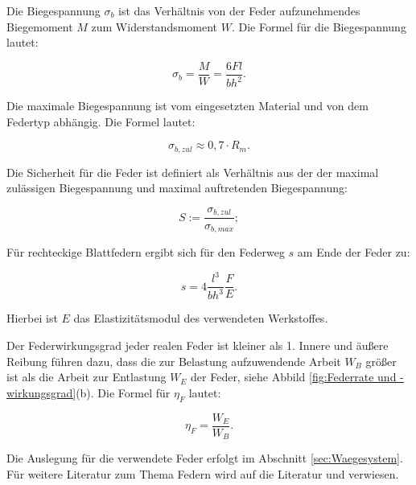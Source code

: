Die Biegespannung $\sigma_b$ ist das Verhältnis von der Feder aufzunehmendes Biegemoment $M$ zum Widerstandsmoment $W$. Die Formel für die Biegespannung lautet:

\begin{equation}
\sigma_b = \frac{M}{W}= \frac{6 F l}{b h^2}.
\label{eq:Biegespannung}
\end{equation}

Die maximale Biegespannung ist vom eingesetzten Material und von dem Federtyp abhängig. Die Formel lautet:

\begin{equation}
\sigma_{b,zul} \approx 0,7 \cdot R_m .
\label{eq:Biegespannung}
\end{equation}

Die Sicherheit für die Feder ist definiert als Verhältnis aus der  der maximal zulässigen Biegespannung und maximal auftretenden Biegespannung:

\begin{equation}
S:= \frac{\sigma_{b,zul}}{\sigma_{b,max}};
\label{eq:Biegespannung}
\end{equation}

Für rechteckige Blattfedern ergibt sich für den Federweg $s$ am Ende der Feder zu: 

\begin{equation}
s = 4 \frac{l^3}{b h^3} \frac{F}{E}.
\label{eq:Federweg}
\end{equation}

Hierbei ist $E$ das Elastizitätsmodul des verwendeten Werkstoffes. 

Der Federwirkungsgrad jeder realen Feder ist kleiner als 1. Innere und äußere Reibung führen dazu, dass die zur Belastung aufzuwendende Arbeit $W_B$ größer ist als die Arbeit zur Entlastung $W_E$ der Feder, siehe Abbild \ref{fig:Federrate und -wirkungsgrad}(b). Die Formel für $\eta_F$ lautet:

\begin{equation}
\eta_F = \frac{W_E}{W_B}.
\label{eq:}
\end{equation}

Die Auslegung für die verwendete Feder erfolgt im Abschnitt \ref{sec:Waegesystem}. Für weitere Literatur zum Thema Federn wird auf die Literatur \citep{Wittel2011} und \citep{Ettemeyer2007} verwiesen. 
